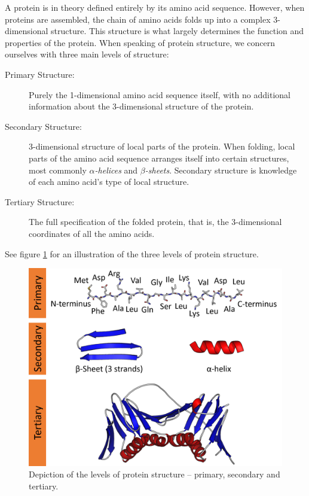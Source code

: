 A protein is in theory defined entirely by its amino acid sequence. However, when proteins are assembled, the chain of amino acids folds up into a complex 3-dimensional structure. This structure is what largely determines the function and properties of the protein. When speaking of protein structure, we concern ourselves with three main levels of structure:

\begin{description}
    \item[Primary Structure:] Purely the 1-dimensional amino acid sequence itself, with no additional information about the 3-dimensional structure of the protein.
    \item[Secondary Structure:] 3-dimensional structure of local parts of the protein. When folding, local parts of the amino acid sequence arranges itself into certain structures, most commonly \textit{$\alpha$-helices} and \textit{$\beta$-sheets}. Secondary structure is knowledge of each amino acid's type of local structure.
    \item[Tertiary Structure:] The full specification of the folded protein, that is, the 3-dimensional coordinates of all the amino acids.
\end{description}

See figure \ref{fig:protein_structure} for an illustration of the three levels of protein structure.

\begin{figure}
    \centering
    \includegraphics[width = \linewidth]{report/figures/protein_structure.png}
    \caption{Depiction of the levels of protein structure -- primary, secondary and tertiary. \cite{protein_structure_fig}}
    \label{fig:protein_structure}
\end{figure}

